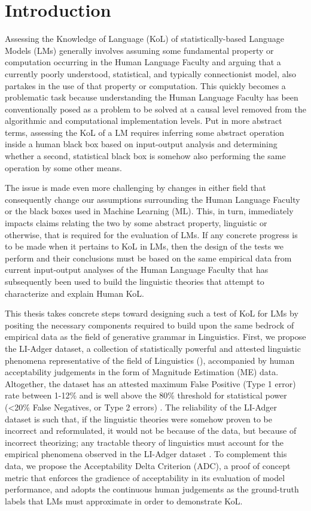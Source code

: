 \chapter*{Introduction}

Assessing the Knowledge of Language (KoL) of statistically-based Language Models (LMs) generally involves assuming some fundamental property or computation occurring in the Human Language Faculty and arguing that a currently poorly understood, statistical, and typically connectionist model, also partakes in the use of that property or computation.  This quickly becomes a problematic task because understanding the Human Language Faculty has been conventionally posed as a problem to be solved at a causal level removed from the algorithmic and computational implementation levels.  Put in more abstract terms, assessing the KoL of a LM requires inferring some abstract operation inside a human black box based on input-output analysis and determining whether a second, statistical black box is somehow also performing the same operation by some other means.  

The issue is made even more challenging by changes in either field that consequently change our assumptions surrounding the Human Language Faculty or the black boxes used in Machine Learning (ML). This, in turn, immediately impacts claims relating the two by some abstract property, linguistic or otherwise, that is required for the evaluation of LMs.  If any concrete progress is to be made when it pertains to KoL in LMs, then the design of the tests we perform and their conclusions must be based on the same empirical data from current input-output analyses of the Human Language Faculty that has subsequently been used to build the linguistic theories that attempt to characterize and explain Human KoL.  

This thesis takes concrete steps toward designing such a test of KoL for LMs by positing the necessary components required to build upon the same bedrock of empirical data as the field of generative grammar in Linguistics.  First, we propose the LI-Adger dataset, a collection of statistically powerful and attested linguistic phenomena representative of the field of Linguistics (\citealt{sprouse2012assessing,sprouse2013comparison}), accompanied by human acceptability judgements in the form of Magnitude Estimation (ME) data.  Altogether, the dataset has an attested maximum False Positive (Type 1 error) rate between 1-12\% and is well above the 80\% threshold for statistical power (<20\% False Negatives, or Type 2 errors) \citep{sprouse2017design}.  The reliability of the LI-Adger dataset is such that, if the linguistic theories were somehow proven to be incorrect and reformulated, it would not be because of the data, but because of incorrect theorizing; any tractable theory of linguistics must account for the empirical phenomena observed in the LI-Adger dataset \citep{sprouse2012assessing}.  To complement this data, we propose the Acceptability Delta Criterion (ADC), a proof of concept metric that enforces the gradience of acceptability in its evaluation of model performance, and adopts the continuous human judgements as the ground-truth labels that LMs must approximate in order to demonstrate KoL.

